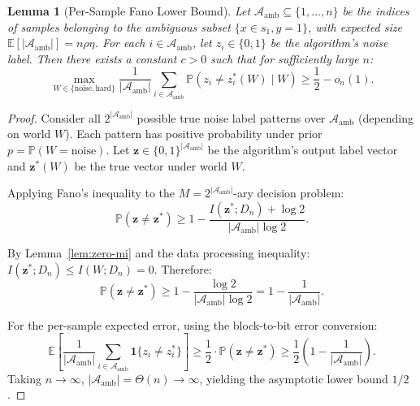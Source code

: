 \documentclass[12pt,a4paper]{article}
\newtheorem{lemma}[theorem]{Lemma}
\theoremstyle{definition}
\theoremstyle{remark}
\begin{document}
\begin{lemma}[Per-Sample Fano Lower Bound]
\label{lem:per-sample-fano}
Let $\mathcal{A}_{\text{amb}} \subseteq \{1,\ldots,n\}$ be the indices of samples belonging to the ambiguous subset $\{x \in s_1, y=1\}$, with expected size $\mathbb{E}[|\mathcal{A}_{\text{amb}}|] = n\rho\eta$. For each $i \in \mathcal{A}_{\text{amb}}$, let $z_i \in \{0,1\}$ be the algorithm's noise label. Then there exists a constant $c > 0$ such that for sufficiently large $n$:
\begin{equation}
\max_{W \in \{\text{noise}, \text{hard}\}} \frac{1}{|\mathcal{A}_{\text{amb}}|} \sum_{i \in \mathcal{A}_{\text{amb}}} \mathbb{P}(z_i \neq z_i^*(W) \mid W) \geq \frac{1}{2} - o_n(1).
\end{equation}
\end{lemma}
\begin{proof}
Consider all $2^{|\mathcal{A}_{\text{amb}}|}$ possible true noise label patterns over $\mathcal{A}_{\text{amb}}$ (depending on world $W$). Each pattern has positive probability under prior $p=\mathbb{P}(W=\text{noise})$. Let $\mathbf{z} \in \{0,1\}^{|\mathcal{A}_{\text{amb}}|}$ be the algorithm's output label vector and $\mathbf{z}^*(W)$ be the true vector under world $W$.

Applying Fano's inequality to the $M = 2^{|\mathcal{A}_{\text{amb}}|}$-ary decision problem:
\begin{equation}
\mathbb{P}(\mathbf{z} \neq \mathbf{z}^*) \geq 1 - \frac{I(\mathbf{z}^*; D_n) + \log 2}{|\mathcal{A}_{\text{amb}}| \log 2}.
\end{equation}

By Lemma~\ref{lem:zero-mi} and the data processing inequality: $I(\mathbf{z}^*; D_n) \leq I(W; D_n) = 0$. Therefore:
\begin{equation}
\mathbb{P}(\mathbf{z} \neq \mathbf{z}^*) \geq 1 - \frac{\log 2}{|\mathcal{A}_{\text{amb}}| \log 2} = 1 - \frac{1}{|\mathcal{A}_{\text{amb}}|}.
\end{equation}

For the per-sample expected error, using the block-to-bit error conversion:
\begin{equation}
\mathbb{E}\left[\frac{1}{|\mathcal{A}_{\text{amb}}|} \sum_{i \in \mathcal{A}_{\text{amb}}} \mathbf{1}\{z_i \neq z_i^*\}\right] \geq \frac{1}{2} \cdot \mathbb{P}(\mathbf{z} \neq \mathbf{z}^*) \geq \frac{1}{2}\left(1 - \frac{1}{|\mathcal{A}_{\text{amb}}|}\right).
\end{equation}
Taking $n \to \infty$, $|\mathcal{A}_{\text{amb}}| = \Theta(n) \to \infty$, yielding the asymptotic lower bound $1/2$.
\end{proof}
\end{document}
